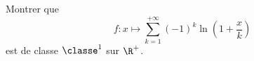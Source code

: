 \begin{enonce}
\begin{exercise}[ID={RMS135 E1458},subtitle={IMT MP 2024},tags={},difficulty={}]

Montrer que
\begin{equation*}
f : x \mapsto \sum_{k=1}^{+\infty} (-1)^k \ln\left(1 + \frac{x}{k}\right)
\end{equation*}
est de classe $\classe^1$ sur $\R^+$.

\end{exercise}
\begin{solution}
\end{solution}
\end{enonce}
